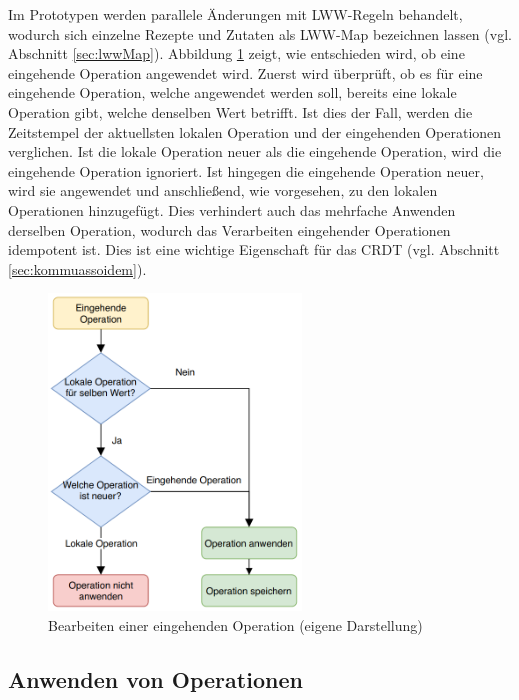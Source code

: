 \documentclass[a4paper, 12pt]{scrreprt}
\begin{document}
Im Prototypen werden parallele Änderungen mit \ac{LWW}-Regeln behandelt, wodurch sich einzelne Rezepte und Zutaten als LWW-Map bezeichnen lassen (vgl. Abschnitt \ref{sec:lwwMap}). Abbildung \ref{fig:flwochartOperationen} zeigt, wie entschieden wird, ob eine eingehende Operation angewendet wird. Zuerst wird überprüft, ob es für eine eingehende Operation, welche angewendet werden soll, bereits eine lokale Operation gibt, welche denselben Wert betrifft. Ist dies der Fall, werden die Zeitstempel der aktuellsten lokalen Operation und der eingehenden Operationen verglichen. Ist die lokale Operation neuer als die eingehende Operation, wird die eingehende Operation ignoriert. Ist hingegen die eingehende Operation neuer, wird sie angewendet und anschließend, wie vorgesehen, zu den lokalen Operationen hinzugefügt. Dies verhindert auch das mehrfache Anwenden derselben Operation, wodurch das Verarbeiten eingehender Operationen idempotent ist. Dies ist eine wichtige Eigenschaft für das CRDT (vgl. Abschnitt \ref{sec:kommuassoidem}). 

\begin{figure}[H]
	\centering
	\includegraphics[width=0.6\textwidth]{flowchartOperationen.png}
	\caption[Bearbeiten einer eingehenden Operation]{Bearbeiten einer eingehenden Operation (eigene Darstellung)}
	\label{fig:flwochartOperationen}
\end{figure}

\subsection{Anwenden von Operationen}
\label{sec:anwendenOperationen}
\end{document}
